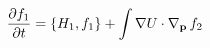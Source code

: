 \documentclass[preview]{standalone}
\begin{document}
\begin{align*}
\special{dvisvgm:raw <g id='unique000'>}\pdv{f_1}{t}=\pb{H_1}{f_1}+\int\nabla U\cdot\nabla_{\va p}\, \special{dvisvgm:raw </g>}\special{dvisvgm:raw <g id='unique001'>}f_2\special{dvisvgm:raw </g>}
\end{align*}
\end{document}
